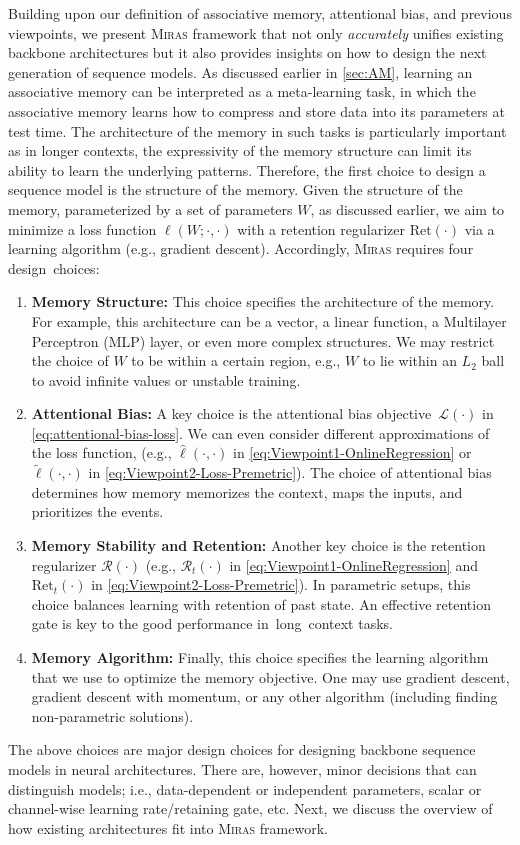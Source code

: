 \documentclass{article}
\newcommand{\framework}[0]{\textsc{Miras}}
\theoremstyle{plain}
\theoremstyle{definition}
\theoremstyle{remark}
\begin{document}
Building upon our definition of associative memory, attentional bias, and previous viewpoints, we present \framework{} framework that not only \emph{accurately} unifies existing backbone architectures but it also provides insights on how to design the next generation of sequence models. As discussed earlier in \autoref{sec:AM}, learning an associative memory can be interpreted as a meta-learning task, in which the associative memory learns how to compress and store data into its parameters at test time. The architecture of the memory in such tasks is particularly important as in longer contexts, the expressivity of the memory structure can limit its ability to learn the underlying patterns. Therefore, the first choice to design a sequence model is the structure of the memory. 
Given the structure of the memory, parameterized by a set of parameters $W$, as discussed earlier, we aim to minimize a loss function $\ell(W; \cdot, \cdot)$ with a retention regularizer $\mbox{Ret}(\cdot)$ via a learning algorithm (e.g., gradient descent). Accordingly, \framework{} requires four design~choices:
\begin{enumerate}[leftmargin=15pt]
    \item \textbf{Memory Structure:} This choice specifies the architecture of the memory. For example, this architecture can be a vector, a linear function, a Multilayer Perceptron (MLP) layer, or even more complex structures. We may restrict the choice of $W$ to be within a certain region, e.g., $W$ to lie within an $L_2$ ball to avoid infinite values or unstable training.
    \item \textbf{Attentional Bias:} A key choice is the attentional bias objective~$\mathcal{L}(\cdot)$ in \autoref{eq:attentional-bias-loss}. We can even consider different approximations of the loss function, (e.g.,  $\widehat{\ell} (\cdot,\cdot)$ in \eqref{eq:Viewpoint1-OnlineRegression} or $\widetilde{\ell}(\cdot,\cdot)$ in \eqref{eq:Viewpoint2-Loss-Premetric}). The choice of attentional bias determines how memory memorizes the context, maps the inputs, and prioritizes the events.
    \item \textbf{Memory Stability and Retention:} Another key choice is the retention regularizer $\mathcal{R}(\cdot)$ (e.g., $\mathcal{R}_t(\cdot)$ in \eqref{eq:Viewpoint1-OnlineRegression} and $\mbox{Ret}_t(\cdot)$ in \eqref{eq:Viewpoint2-Loss-Premetric}). In parametric setups, this choice balances learning with retention of past state. An effective retention gate is key to the good performance in~long~context tasks. 
    \item \textbf{Memory Algorithm:} Finally, this choice specifies the learning algorithm that we use to optimize the memory objective. One may use gradient descent, gradient descent with momentum, or any other algorithm (including finding non-parametric solutions).  
\end{enumerate}
The above choices are major design choices for designing backbone sequence models in neural architectures. There are, however, minor decisions that can distinguish models; i.e., data-dependent or independent parameters, scalar or channel-wise learning rate/retaining gate, etc. Next, we discuss the overview of how existing architectures fit into \framework{} framework. 
 
\end{document}

